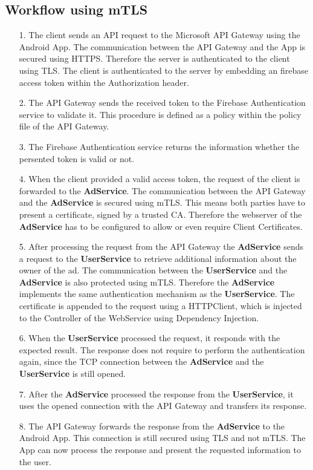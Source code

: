 \subsection{Workflow using mTLS}
\begin{enumerate}
	\item[1.] The client sends an API request to the Microsoft API Gateway using the Android App.
		The communication between the API Gateway and the App is secured using HTTPS.
		Therefore the server is authenticated to the client using TLS.
		The client is authenticated to the server by embedding an firebase access token within the Authorization header.
	\item[2.] The API Gateway sends the received token to the Firebase Authentication service to validate it.
		This procedure is defined as a policy within the policy file of the API Gateway.
		\\
	\item[3.] The Firebase Authentication service returns the information whether the persented token is valid or not.
	\item[4.] When the client provided a valid access token, the request of the client is forwarded to the \textbf{AdService}.
		The communication between the API Gateway and the \textbf{AdService} is secured using mTLS.
		This means both parties have to present a certificate, signed by a trusted CA.
		Therefore the webserver of the \textbf{AdService} has to be configured to allow or even require Client Certificates.
	\item[5.] After processing the request from the API Gateway the \textbf{AdService} sends a request to the \textbf{UserService} to retrieve additional information about the owner of the ad.
		The communication between the \textbf{UserService} and the \textbf{AdService} is also protected using mTLS.
		Therefore the \textbf{AdService} implements the same authentication mechanism as the \textbf{UserService}.
		The certificate is appended to the request using a HTTPClient, which is injected to the Controller of the WebService using Dependency Injection.
	\item[6.] When the \textbf{UserService} processed the request, it responds with the expected result.
		The response does not require to perform the authentication again, since the TCP connection between the \textbf{AdService} and the \textbf{UserService} is still opened.
	\item[7.] After the \textbf{AdService} processed the response from the \textbf{UserService}, it uses the opened connection with the API Gateway and transfers its response.
	\item[8.] The API Gateway forwards the response from the \textbf{AdService} to the Android App.
		This connection is still secured using TLS and not mTLS.
		The App can now process the response and present the requested information to the user.
\end{enumerate}

